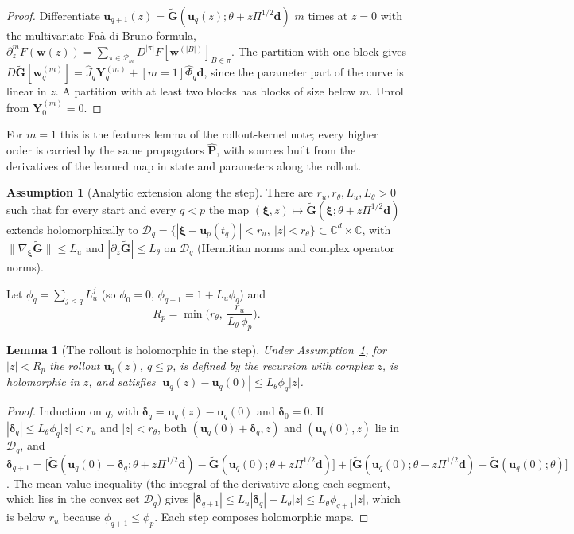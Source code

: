 \documentclass[11pt]{article}
\newtheorem{lemma}{Lemma}
\theoremstyle{definition}
\newtheorem{assumption}{Assumption}
\theoremstyle{remark}
\newcommand{\uu}{\mathbf{u}}
\newcommand{\Gt}{\tilde{\mathbf{G}}}
\newcommand{\Ph}{\hat{\mathbf P}}
\newcommand{\Phih}{\hat\Phi}
\begin{document}
\begin{proof}
Differentiate $\uu_{q+1}(z)=\Gt(\uu_q(z);\theta+z\Pi^{1/2}\mathbf d)$ $m$ times at $z=0$ with the multivariate Faà di Bruno formula, $\partial_z^mF(\mathbf w(z))=\sum_{\pi\in\mathcal P_m}D^{|\pi|}F[\mathbf w^{(|B|)}]_{B\in\pi}$. The partition with one block gives $D\Gt[\mathbf w^{(m)}_q]=\hat J_q\mathbf Y^{(m)}_q+[m=1]\Phih_q\mathbf d$, since the parameter part of the curve is linear in $z$. A partition with at least two blocks has blocks of size below $m$. Unroll from $\mathbf Y^{(m)}_0=0$.
\end{proof}

For $m=1$ this is the features lemma of the rollout-kernel note; every higher order is carried by the same propagators $\Ph$, with sources built from the derivatives of the learned map in state and parameters along the rollout.

\begin{assumption}[Analytic extension along the step]\label{ass:stepanalytic}
There are $r_u,r_\theta,L_u,L_\theta>0$ such that for every start and every $q<p$ the map $(\bm\xi,z)\mapsto\Gt(\bm\xi;\theta+z\Pi^{1/2}\mathbf d)$ extends holomorphically to $\mathcal D_q=\{|\bm\xi-\uu_p(t_q)|<r_u,\ |z|<r_\theta\}\subset\mathbb C^d\times\mathbb C$, with $\|\nabla_{\bm\xi}\Gt\|\le L_u$ and $|\partial_z\Gt|\le L_\theta$ on $\mathcal D_q$ (Hermitian norms and complex operator norms).
\end{assumption}

Let $\phi_q=\sum_{j<q}L_u^j$ (so $\phi_0=0$, $\phi_{q+1}=1+L_u\phi_q$) and
\[
R_p=\min\Big(r_\theta,\ \frac{r_u}{L_\theta\,\phi_p}\Big).
\]

\begin{lemma}[The rollout is holomorphic in the step]\label{lem:stepholo}
Under Assumption~\ref{ass:stepanalytic}, for $|z|<R_p$ the rollout $\uu_q(z)$, $q\le p$, is defined by the recursion with complex $z$, is holomorphic in $z$, and satisfies $|\uu_q(z)-\uu_q(0)|\le L_\theta\phi_q|z|$.
\end{lemma}

\begin{proof}
Induction on $q$, with $\bm\delta_q=\uu_q(z)-\uu_q(0)$ and $\bm\delta_0=0$. If $|\bm\delta_q|\le L_\theta\phi_q|z|<r_u$ and $|z|<r_\theta$, both $(\uu_q(0)+\bm\delta_q,z)$ and $(\uu_q(0),z)$ lie in $\mathcal D_q$, and
$\bm\delta_{q+1}=\big[\Gt(\uu_q(0)+\bm\delta_q;\theta+z\Pi^{1/2}\mathbf d)-\Gt(\uu_q(0);\theta+z\Pi^{1/2}\mathbf d)\big]+\big[\Gt(\uu_q(0);\theta+z\Pi^{1/2}\mathbf d)-\Gt(\uu_q(0);\theta)\big]$.
The mean value inequality (the integral of the derivative along each segment, which lies in the convex set $\mathcal D_q$) gives $|\bm\delta_{q+1}|\le L_u|\bm\delta_q|+L_\theta|z|\le L_\theta\phi_{q+1}|z|$, which is below $r_u$ because $\phi_{q+1}\le\phi_p$. Each step composes holomorphic maps.
\end{proof}
\end{document}
